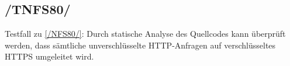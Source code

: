 \subsection*{/TNFS80/}

\label{/TNFS80/} Testfall zu \ref{/NFS80/}: Durch \gls{statische Analyse} des \Gls{Quellcode}s kann überprüft werden, dass sämtliche unverschlüsselte \Gls{HTTP}-Anfragen auf verschlüsseltes \Gls{HTTPS} umgeleitet wird.